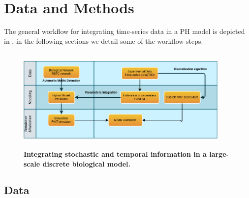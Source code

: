 
\section{Data and Methods}

The general workflow for integrating time-series data in a PH model is depicted in , in the following sections we 
detail some of the workflow steps.


\begin{figure}[!t]
 \centering
 \includegraphics[width=4.1in,height=2in]{images/workflow-2.png}
\caption{{\bf Integrating stochastic and temporal information in a large-scale discrete biological model.}} 
 \label{fig:workflow}
\end{figure}


\subsection{Data}

